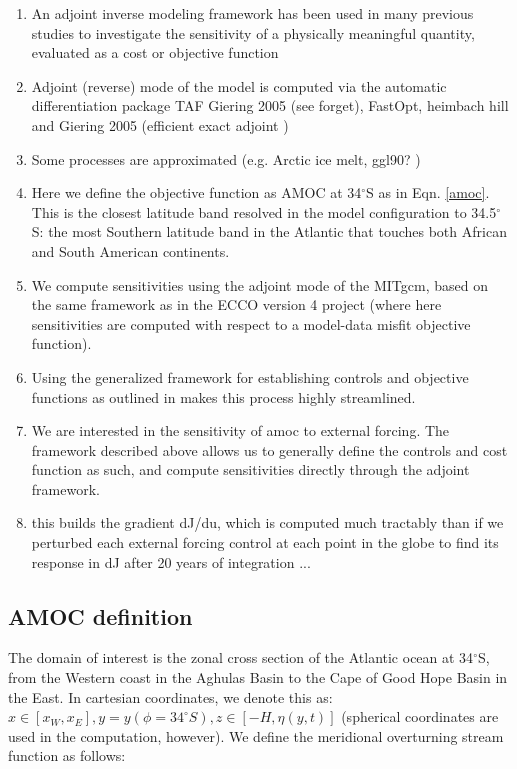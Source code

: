 \documentclass[a4paper,11pt]{article}
\begin{document}
	\begin{enumerate}
	  \item An adjoint inverse modeling framework has been used in many previous studies to investigate the sensitivity of a physically meaningful quantity, evaluated as a cost or objective function \cite{marotzke} \cite{heimbach_timescales} \cite{pillar} \cite{czeschel}
	  \item Adjoint (reverse) mode of the model is computed via the automatic differentiation package TAF Giering 2005 (see forget), FastOpt, heimbach hill and Giering 2005 (efficient exact adjoint )
	  \item Some processes are approximated (e.g. Arctic ice melt, ggl90? )

	  \item Here we define the objective function as AMOC at 34$^{\circ}$S as in Eqn. \ref{amoc}. This is the closest latitude band resolved in the model configuration to 34.5$^{\circ}$S: the most Southern latitude band in the Atlantic that touches both African and South American continents. 

	  \item We compute sensitivities using the adjoint mode of the MITgcm, based on the same framework as in the ECCO version 4 project (where here sensitivities are computed with respect to a model-data misfit objective function). 
	  \item Using the generalized framework for establishing controls and objective functions as outlined in \cite{forgetECCOv4} makes this process highly streamlined.
	  \item We are interested in the sensitivity of amoc to external forcing. The framework described above allows us to generally define the controls and cost function as such, and compute sensitivities directly through the adjoint framework.
	  \item this builds the gradient dJ/du, which is computed much tractably than if we perturbed each external forcing control at each point in the globe to find its response in dJ after 20 years of integration ... 
	\end{enumerate}

  \subsection{AMOC definition}
  
    The domain of interest is the zonal cross section of the Atlantic ocean at 34$^{\circ}$S, from the Western coast in the Aghulas Basin to the Cape of Good Hope Basin in the East. In cartesian coordinates, we denote this as: $x \in [x_W,x_E], y = y(\phi=34^{\circ}S), z \in [-H,\eta(y,t)]$ (spherical coordinates are used in the computation, however).  We define the meridional overturning stream function as follows: 
    
\end{document}
